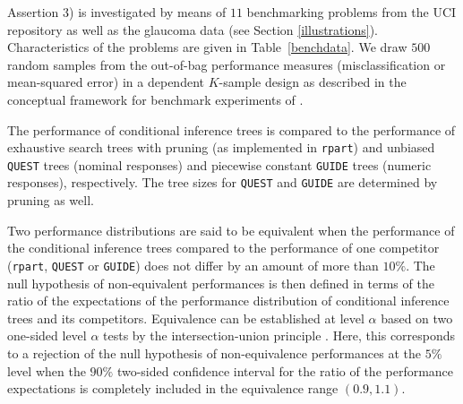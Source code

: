 Assertion 3) is investigated by means of $11$ benchmarking problems from
the UCI repository \citep{Blake+Merz:1998} as well as the glaucoma data (see
Section \ref{illustrations}).
Characteristics of the problems are given in Table~\ref{benchdata}. We draw
$500$ random samples from the out-of-bag performance measures
(misclassification or mean-squared error) in a dependent $K$-sample design
as described in the conceptual framework for benchmark experiments of 
\cite{Benchmarking2005}. 


The performance of conditional inference trees is compared to the
performance of exhaustive search trees with pruning (as implemented in
\texttt{rpart}) and unbiased \texttt{QUEST} trees (nominal responses) and
piecewise constant \texttt{GUIDE} trees (numeric responses), respectively.
The tree sizes for \texttt{QUEST} and \texttt{GUIDE} are determined by
pruning as well.

Two performance distributions are said to be equivalent when 
the performance of the conditional inference trees compared 
to the performance of one competitor (\texttt{rpart}, \texttt{QUEST} or \texttt{GUIDE}) 
does not differ 
by an amount of more than $10\%$. The null hypothesis of non-equivalent performances 
is then defined in terms of the ratio of the expectations of the performance
distribution of conditional inference trees and its competitors. 
Equivalence can be established at level $\alpha$ based on two one-sided level
$\alpha$ tests by the intersection-union principle \citep{BergerHsu1996}.
Here, this corresponds to a rejection of the null hypothesis of
non-equivalence performances at the $5\%$ level when the $90\%$ two-sided
\cite{Fieller1940} confidence interval 
for the ratio of the performance expectations is completely included in the 
equivalence range $(0.9, 1.1)$.


